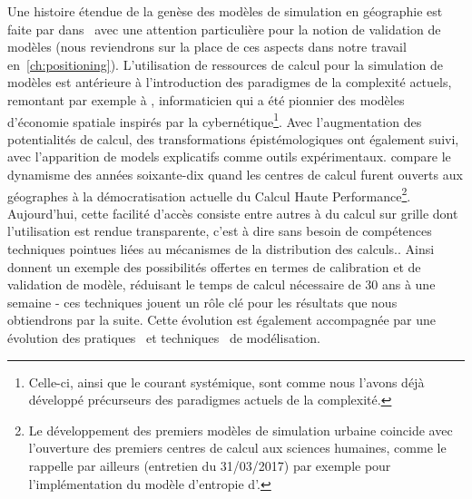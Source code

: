 {Une histoire étendue de la genèse des modèles de simulation en géographie est faite par  dans~\cite{rey2015plateforme} avec une attention particulière pour la notion de validation de modèles (nous reviendrons sur la place de ces aspects dans notre travail en~\ref{ch:positioning}). L'utilisation de ressources de calcul pour la simulation de modèles est antérieure à l'introduction des paradigmes de la complexité actuels, remontant par exemple à , informaticien qui a été pionnier des modèles d'économie spatiale inspirés par la cybernétique\footnote{Celle-ci, ainsi que le courant systémique, sont comme nous l'avons déjà développé précurseurs des paradigmes actuels de la complexité.}. Avec l'augmentation des potentialités de calcul, des transformations épistémologiques ont également suivi, avec l'apparition de models explicatifs comme outils expérimentaux.  compare le dynamisme des années soixante-dix quand les centres de calcul furent ouverts aux géographes à la démocratisation actuelle du Calcul Haute Performance\footnote{Le développement des premiers modèles de simulation urbaine coincide avec l'ouverture des premiers centres de calcul aux sciences humaines, comme le rappelle par ailleurs  (entretien du 31/03/2017) par exemple pour l'implémentation du modèle d'entropie d'.}. Aujourd'hui, cette facilité d'accès consiste entre autres à du calcul sur grille dont l'utilisation est rendue transparente, c'est à dire sans besoin de compétences techniques pointues liées au mécanismes de la distribution des calculs.. Ainsi~\cite{schmitt2014half} donnent un exemple des possibilités offertes en termes de calibration et de validation de modèle, réduisant le temps de calcul nécessaire de 30 ans à une semaine - ces techniques jouent un rôle clé pour les résultats que nous obtiendrons par la suite. Cette évolution est également accompagnée par une évolution des pratiques~\cite{banos2013pour} et techniques~\cite{10.1371/journal.pone.0138212} de modélisation.
}


